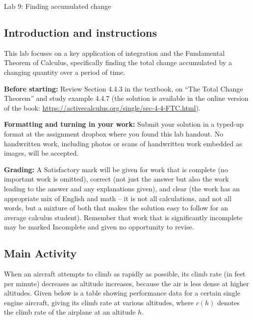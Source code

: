 \documentclass[11pt,letterpaper]{article}
\begin{document}
\begin{flushright}
	\begin{Large}
		Lab 9: Finding accumulated change 
	\end{Large}
\end{flushright}



\subsection*{Introduction and instructions} 

This lab focuses on a key application of integration and the Fundamental Theorem of Calculus, specifically finding the total change accumulated by a changing quantity over a period of time.  

\noindent
\textbf{Before starting:} Review Section 4.4.3 in the textbook, on ``The Total Change Theorem'' and study example 4.4.7 (the solution is available in the online version of the book: \url{https://activecalculus.org/single/sec-4-4-FTC.html}). 


\noindent
\textbf{Formatting and turning in your work:} Submit your solution in a typed-up format at the assignment dropbox where you found this lab handout. No handwritten work, including photos or scans of handwritten work embedded as images, will be accepted. 

\noindent
\textbf{Grading:} A Satisfactory mark will be given for work that is
complete (no important work is omitted), correct (not just the answer but also the work leading to the answer and any explanations given), and clear (the work has an appropriate mix of English and math -- it is not all calculations, and not all words, but a mixture of both that makes the solution easy to follow for an average calculus student). Remember that work that is significantly incomplete may be marked Incomplete and given no opportunity to revise. 


\subsection*{Main Activity}


When an aircraft attempts to climb as rapidly as possible, its climb rate (in feet per minute) decreases as altitude increases, because the air is less dense at higher altitudes. Given below is a table showing performance data for a certain single engine aircraft, giving its climb rate at various altitudes, where $c(h)$ denotes the climb rate of the airplane at an altitude $h$.
\end{document}
